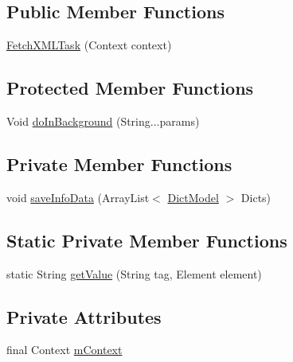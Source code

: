 \subsection*{Public Member Functions}
\begin{DoxyCompactItemize}
\item 
\hyperlink{classorg_1_1buildmlearn_1_1dictation_1_1data_1_1FetchXMLTask_a11b4026ce6d205088c575e21e1d00d26}{Fetch\+X\+M\+L\+Task} (Context context)
\end{DoxyCompactItemize}
\subsection*{Protected Member Functions}
\begin{DoxyCompactItemize}
\item 
Void \hyperlink{classorg_1_1buildmlearn_1_1dictation_1_1data_1_1FetchXMLTask_abe6fd7653b424ed0b8bb7f82ef8f7706}{do\+In\+Background} (String...\+params)
\end{DoxyCompactItemize}
\subsection*{Private Member Functions}
\begin{DoxyCompactItemize}
\item 
void \hyperlink{classorg_1_1buildmlearn_1_1dictation_1_1data_1_1FetchXMLTask_a1d76d594f02e5c1d03c49b63463a1fb7}{save\+Info\+Data} (Array\+List$<$ \hyperlink{classorg_1_1buildmlearn_1_1dictation_1_1data_1_1DictModel}{Dict\+Model} $>$ Dicts)
\end{DoxyCompactItemize}
\subsection*{Static Private Member Functions}
\begin{DoxyCompactItemize}
\item 
static String \hyperlink{classorg_1_1buildmlearn_1_1dictation_1_1data_1_1FetchXMLTask_a42fbe139784e717080ae40d960aba994}{get\+Value} (String tag, Element element)
\end{DoxyCompactItemize}
\subsection*{Private Attributes}
\begin{DoxyCompactItemize}
\item 
final Context \hyperlink{classorg_1_1buildmlearn_1_1dictation_1_1data_1_1FetchXMLTask_a490e93705a937af261784927059932a6}{m\+Context}
\end{DoxyCompactItemize}


